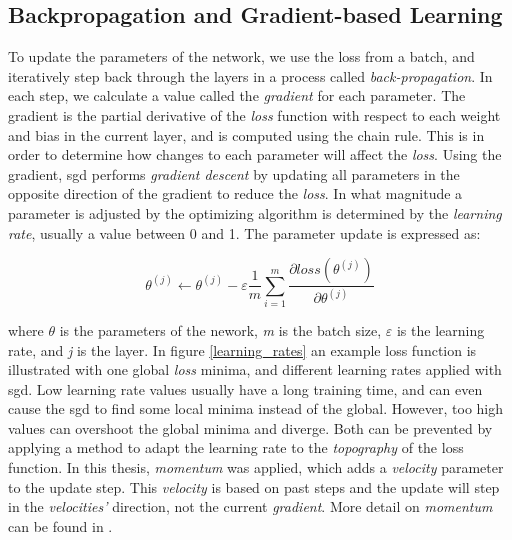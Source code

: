 \subsection{Backpropagation and Gradient-based Learning}\label{backpropagation}
    To update the parameters of the network, we use the loss from a batch, and iteratively step back through the layers in a process called \textit{back-propagation}\cite{rumelhart1986learning_backprop}. In each step, we calculate a value called the \textit{gradient} for each parameter. The gradient is the partial derivative of the \textit{loss} function with respect to each weight and bias in the current layer, and is computed using the chain rule. This is in order to determine how changes to each parameter will affect the \textit{loss}. Using the gradient, \gls{sgd} performs \textit{gradient descent}\cite{Goodfellow-et-al-2016_gradient_descent} by updating all parameters in the opposite direction of the gradient to reduce the \textit{loss}. In what magnitude a parameter is adjusted by the optimizing algorithm is determined by the \textit{learning rate}, usually a value between 0 and 1. The parameter update is expressed as\cite{pmlr-v37-ioffe15_batch_norm}:
    
    \begin{equation}
    \theta^{(j)} \leftarrow \theta^{(j)} - \varepsilon \dfrac{1}{m}\sum_{i=1}^{m} \dfrac{\partial loss (\theta^{(j)})}{\partial \theta^{(j)}}
    \end{equation}
    
    where $\theta$ is the parameters of the nework, \textit{m} is the batch size, $\varepsilon$ is the learning rate, and \textit{j} is the layer. In figure \ref{learning_rates} an example loss function is illustrated with one global \textit{loss} minima, and different learning rates applied with \gls{sgd}. Low learning rate values usually have a long training time, and can even cause the \gls{sgd} to find some local minima instead of the global\cite{farsal2018deep}. However, too high values can overshoot the global minima and diverge. Both can be prevented by applying a method to adapt the learning rate to the \textit{topography} of the loss function. In this thesis, \textit{momentum} was applied, which adds a \textit{velocity} parameter to the update step. This \textit{velocity} is based on past steps and the update will step in the \textit{velocities'} direction, not the current \textit{gradient}. More detail on \textit{momentum} can be found in \citeauthor{pmlr-v28-sutskever13}\cite{pmlr-v28-sutskever13}.
    
